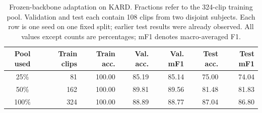 \begin{table}[t]
\centering
\caption{Frozen-backbone adaptation on KARD. Fractions refer to the 324-clip training pool. Validation and test each contain 108 clips from two disjoint subjects. Each row is one seed on one fixed split; earlier test results were already observed. All values except counts are percentages; mF1 denotes macro-averaged F1.}
\label{tab:kard-frozen-head}
\small
\setlength{\tabcolsep}{5pt}
\begin{tabular}{crrrrrr}
\toprule
Pool used & Train clips & Train acc. & Val. acc. & Val. mF1 & Test acc. & Test mF1 \\
\midrule
25\% & 81 & 100.00 & 85.19 & 85.14 & 75.00 & 74.04 \\
50\% & 162 & 100.00 & 89.81 & 89.56 & 81.48 & 81.83 \\
100\% & 324 & 100.00 & 88.89 & 88.77 & 87.04 & 86.80 \\
\bottomrule
\end{tabular}
\end{table}
